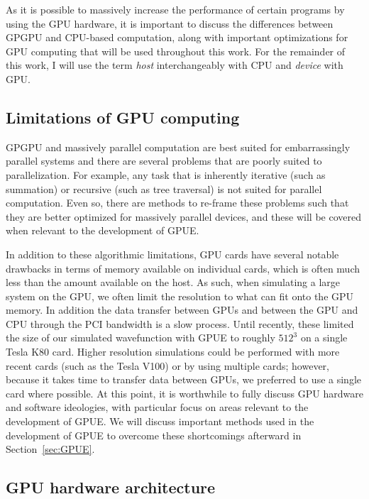 As it is possible to massively increase the performance of certain programs by using the GPU hardware, it is important to discuss the differences between GPGPU and CPU-based computation, along with important optimizations for GPU computing that will be used throughout this work.
For the remainder of this work, I will use the term \textit{host} interchangeably with CPU and \textit{device} with GPU.

\subsection{Limitations of GPU computing}

GPGPU and massively parallel computation are best suited for embarrassingly parallel systems and there are several problems that are poorly suited to parallelization.
For example, any task that is inherently iterative (such as summation) or recursive (such as tree traversal) is not suited for parallel computation.
Even so, there are methods to re-frame these problems such that they are better optimized for massively parallel devices, and these will be covered when relevant to the development of GPUE.

In addition to these algorithmic limitations, GPU cards have several notable drawbacks in terms of memory available on individual cards, which is often much less than the amount available on the host.
As such, when simulating a large system on the GPU, we often limit the resolution to what can fit onto the GPU memory.
In addition the data transfer between GPUs and between the GPU and CPU through the PCI bandwidth is a slow process.
Until recently, these limited the size of our simulated wavefunction with GPUE to roughly $512^3$ on a single Tesla K80 card.
Higher resolution simulations could be performed with more recent cards (such as the Tesla V100) or by using multiple cards; however, because it takes time to transfer data between GPUs, we preferred to use a single card where possible.
At this point, it is worthwhile to fully discuss GPU hardware and software ideologies, with particular focus on areas relevant to the development of GPUE.
We will discuss important methods used in the development of GPUE to overcome these shortcomings afterward in Section~\ref{sec:GPUE}.

\subsection{GPU hardware architecture}

